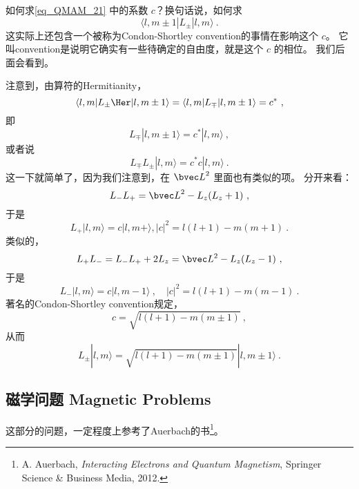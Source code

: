 \begin{exercise}{}\label{exe_QMAM_2}
如何求\autoref{eq_QMAM_21} 中的系数 $c$？换句话说，如何求
\begin{equation}
\langle l,m\pm1|L_{\pm}|l,m\rangle~.
\end{equation}
这实际上还包含一个被称为Condon-Shortley convention的事情在影响这个 $c$。 它叫convention是说明它确实有一些待确定的自由度，就是这个 $c$ 的相位。 我们后面会看到。

注意到，由算符的Hermitianity，
\begin{equation}
\langle l,m|L_{\pm}\Her|l,m\pm1\rangle = \langle l,m|L_{\mp}|l,m\pm1\rangle = c^*~,
\end{equation}
即
\begin{equation}
L_{\mp}|l,m\pm1\rangle = c^*|l,m\rangle~,
\end{equation}
或者说
\begin{equation}
L_{\mp}L_{\pm}|l,m\rangle = c^*c|l,m\rangle~.
\end{equation}
这一下就简单了，因为我们注意到，在 ${\bvec L}^2$ 里面也有类似的项。 分开来看：
\begin{equation}
L_-L_+ = {\bvec L}^2 - L_z(L_z+1)~,
\end{equation}
于是
\begin{equation}
L_+|l,m\rangle = c|l,m+\rangle, |c|^2 = l(l+1)-m(m+1)~.
\end{equation}
类似的，
\begin{equation}
L_+L_- = L_-L_+ +2L_z = {\bvec L^2} -L_z(L_z-1)~,
\end{equation}
于是
\begin{equation}
L_-|l,m\rangle = c|l,m-1\rangle~, \quad |c|^2 = l(l+1)-m(m-1) ~.
\end{equation}
著名的Condon-Shortley convention规定，
\begin{equation}
c = \sqrt{l(l+1) - m(m\pm1)}~,
\end{equation}
从而
\begin{equation}
L_{\pm}|l,m\rangle = \sqrt{l(l+1) - m(m\pm 1)}|l,m\pm1\rangle~.
\end{equation}
\end{exercise}

\subsection{磁学问题 Magnetic Problems}

这部分的问题，一定程度上参考了Auerbach的书\footnote{A. Auerbach, \textsl{Interacting Electrons and Quantum Magnetism}, Springer Science \& Business Media, 2012.}。